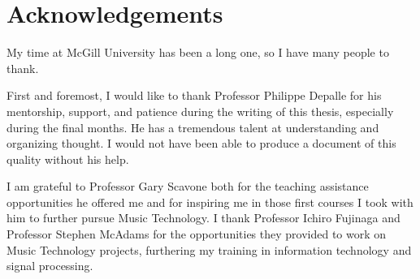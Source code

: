 \section*{Acknowledgements}
My time at McGill University has been a long one, so I have many people to thank.

First and foremost, I would like to thank Professor Philippe Depalle for his mentorship,
support, and patience during the writing of this thesis, especially during the
final months. He has a tremendous talent at understanding and organizing
thought. I would not have been able to produce a document of this quality
without his help.

I am grateful to Professor Gary Scavone both for the teaching assistance
opportunities he offered me and for inspiring me in those first courses I took
with him to further pursue Music Technology. I thank Professor Ichiro Fujinaga
and Professor Stephen McAdams for the opportunities they provided to work on
Music Technology projects, furthering my training in information technology and
signal processing.

